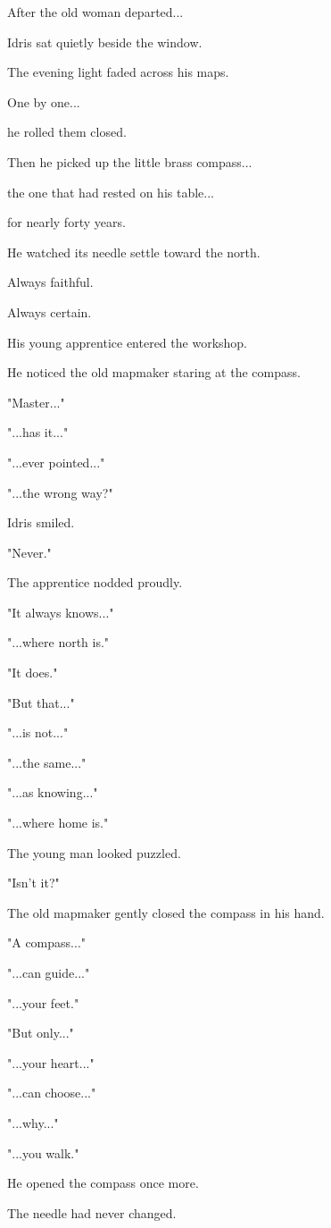 \documentclass[12pt,openany]{book}
\begin{document}
After the old woman departed...

Idris sat quietly beside the window.

The evening light faded across his maps.

One by one...

he rolled them closed.

Then he picked up the little brass compass...

the one that had rested on his table...

for nearly forty years.

He watched its needle settle toward the north.

Always faithful.

Always certain.

His young apprentice entered the workshop.

He noticed the old mapmaker staring at the compass.

"Master..."

"...has it..."

"...ever pointed..."

"...the wrong way?"

Idris smiled.

"Never."

The apprentice nodded proudly.

"It always knows..."

"...where north is."

"It does."

"But that..."

"...is not..."

"...the same..."

"...as knowing..."

"...where home is."

The young man looked puzzled.

"Isn't it?"

The old mapmaker gently closed the compass in his hand.

"A compass..."

"...can guide..."

"...your feet."

"But only..."

"...your heart..."

"...can choose..."

"...why..."

"...you walk."

He opened the compass once more.

The needle had never changed.
\end{document}
